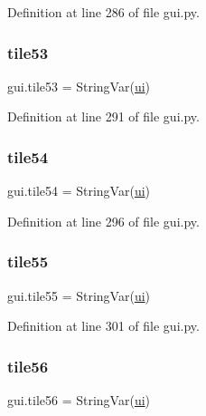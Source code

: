 Definition at line 286 of file gui.\+py.

\mbox{\label{namespacegui_a449b826a702e5cc4b285882012dd3d8a}} 
\subsubsection{\texorpdfstring{tile53}{tile53}}
{\footnotesize\ttfamily gui.\+tile53 = String\+Var(\mbox{\hyperlink{namespacegui_a40ab7281456eadbea2dc2038f5c24fa1}{ui}})}



Definition at line 291 of file gui.\+py.

\mbox{\label{namespacegui_ac53f25e251f182149848acb4f70689ce}} 
\subsubsection{\texorpdfstring{tile54}{tile54}}
{\footnotesize\ttfamily gui.\+tile54 = String\+Var(\mbox{\hyperlink{namespacegui_a40ab7281456eadbea2dc2038f5c24fa1}{ui}})}



Definition at line 296 of file gui.\+py.

\mbox{\label{namespacegui_ab5439a2d27d228c10b945525d2cd4ba1}} 
\subsubsection{\texorpdfstring{tile55}{tile55}}
{\footnotesize\ttfamily gui.\+tile55 = String\+Var(\mbox{\hyperlink{namespacegui_a40ab7281456eadbea2dc2038f5c24fa1}{ui}})}



Definition at line 301 of file gui.\+py.

\mbox{\label{namespacegui_ae2646c4dbcba62132b11bc430f3c5b45}} 
\subsubsection{\texorpdfstring{tile56}{tile56}}
{\footnotesize\ttfamily gui.\+tile56 = String\+Var(\mbox{\hyperlink{namespacegui_a40ab7281456eadbea2dc2038f5c24fa1}{ui}})}



